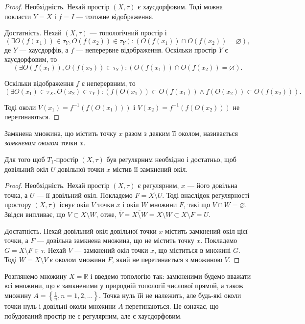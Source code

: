 \documentclass[a4paper, 12pt]{article}
\newcommand{\RR}{\mathbb{R}}
\renewcommand{\emptyset}{\varnothing}
\begin{document}
\begin{proof}
	Необхідність. Нехай простір $(X, \tau)$ є
	хаусдорфовим. Тоді можна покласти $Y = X$ і $f = I$ ---
	тотожне відображення. \smallskip

	Достатність. Нехай $(X, \tau)$ --- топологічний простір і
	\[ (\exists O(f(x_1)) \in \tau_Y, O(f(x_2)) \in \tau_Y): (O(f(x_1)) \cap O(f(x_2)) = \emptyset), \] 
	де $Y$ --- хаусдорфів, а
	$f$ --- неперервне відображення. Оскільки простір $Y$ є
	хаусдорфовим, то
	\[ (\exists O(f(x_1)), O(f(x_2)) \in \tau_Y): (O(f(x_1)) \cap O(f(x_2)) = \emptyset). \]

	Оскільки відображення $f$ є неперервним, то
	\[ (\exists O(x_1) \in \tau_X, O(x_2) \in \tau_Y): (f(O(x_1)) \subset O(f(x_1)) \land f(O(x_2)) \subset O(f(x_2))). \]

	Тоді околи $V(x_1) = f^{-1}(f(O(x_1)))$ і $V(x_2) = f^{-1}(f(O(x_2)))$
	не перетинаються. 
\end{proof}

\begin{definition}
	Замкнена множина, що містить точку $x$
	разом з деяким її околом, називається \textit{замкненим околом}
	точки $x$.
\end{definition}

\begin{theorem}
	Для того щоб $T_1$-простір $(X, \tau)$ був регулярним необхідно і достатньо,
	щоб довільний окіл $U$ довільної точки $x$ містив її
	замкнений окіл.
\end{theorem}

\begin{proof}
	Необхідність. Нехай простір $(X, \tau)$ є
	регулярним, $x$ --- його довільна точка, а $U$ --- її довільний
	окіл. Покладемо $F = X \setminus U$. Тоді внаслідок регулярності
	простору $(X, \tau)$ існує окіл $V$ точки $x$ і окіл $W$ множини
	$F$, такі що $V \cap W = \emptyset$. Звідси випливає, що $V \subset X \setminus W$,
	отже, $\overline{V} = \overline{X \setminus W} = X \setminus W \subset X \setminus F = U$. \smallskip
	
	Достатність. Нехай довільний окіл довільної точки $x$
	містить замкнений окіл цієї точки, а $F$ --- довільна замкнена
	множина, що не містить точку $x$. Покладемо $G = X \setminus F \in \tau$.
	Нехай $V$ --- замкнений окіл точки $x$, що міститься в
	множині $G$. Тоді $W = X \setminus V$ є околом множини $F$, який не
	перетинається з множиною $V$.
\end{proof}

\begin{example}
	Розглянемо множину $X = \RR$ і введемо
	топологію так: замкненими будемо вважати всі множини,
	що є замкненими у природній топології числової прямой, а
	також множину $A = \left\{ \frac1n, n = 1, 2, \ldots \right\}$. 
	Точка нуль їй не належить, але будь-які околи точки нуль і довільні околи
	множини $A$ перетинаються. Це означає, що побудований
	простір не є регулярним, але є хаусдорфовим.
\end{example}
\end{document}
